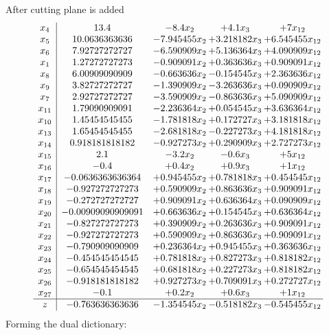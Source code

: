 \documentclass[11pt]{article}
\begin{document}
 After cutting plane is added 
\[\begin{array}{c| c c@{\hskip 2pt} c@{\hskip 2pt} c@{\hskip 2pt} }
 x_{4}   &  13.4 & -8.4 x_{2} & + 4.1 x_{3} & + 7 x_{12}\\
 x_{5}   &  10.0636363636 & -7.945455 x_{2} & + 3.218182 x_{3} & + 6.545455 x_{12}\\
 x_{6}   &  7.92727272727 & -6.590909 x_{2} & + 5.136364 x_{3} & + 4.090909 x_{12}\\
 x_{1}   &  1.27272727273 & -0.909091 x_{2} & + 0.363636 x_{3} & + 0.909091 x_{12}\\
 x_{8}   &  6.00909090909 & -0.663636 x_{2} & -0.154545 x_{3} & + 2.363636 x_{12}\\
 x_{9}   &  3.82727272727 & -1.390909 x_{2} & -3.263636 x_{3} & + 0.090909 x_{12}\\
 x_{7}   &  2.92727272727 & -3.590909 x_{2} & -0.863636 x_{3} & + 5.090909 x_{12}\\
 x_{11}   &  1.79090909091 & -2.236364 x_{2} & + 0.054545 x_{3} & + 3.636364 x_{12}\\
 x_{10}   &  1.45454545455 & -1.781818 x_{2} & + 0.172727 x_{3} & + 3.181818 x_{12}\\
 x_{13}   &  1.65454545455 & -2.681818 x_{2} & -0.227273 x_{3} & + 4.181818 x_{12}\\
 x_{14}   &  0.918181818182 & -0.927273 x_{2} & + 0.290909 x_{3} & + 2.727273 x_{12}\\
 x_{15}   &  2.1 & -3.2 x_{2} & -0.6 x_{3} & + 5 x_{12}\\
 x_{16}   &  -0.4 & + 0.4 x_{2} & + 0.9 x_{3} & + 1 x_{12}\\
 x_{17}   &  -0.0636363636364 & + 0.945455 x_{2} & + 0.781818 x_{3} & + 0.454545 x_{12}\\
 x_{18}   &  -0.927272727273 & + 0.590909 x_{2} & + 0.863636 x_{3} & + 0.909091 x_{12}\\
 x_{19}   &  -0.272727272727 & + 0.909091 x_{2} & + 0.636364 x_{3} & + 0.090909 x_{12}\\
 x_{20}   &  -0.00909090909091 & + 0.663636 x_{2} & + 0.154545 x_{3} & + 0.636364 x_{12}\\
 x_{21}   &  -0.827272727273 & + 0.390909 x_{2} & + 0.263636 x_{3} & + 0.909091 x_{12}\\
 x_{22}   &  -0.927272727273 & + 0.590909 x_{2} & + 0.863636 x_{3} & + 0.909091 x_{12}\\
 x_{23}   &  -0.790909090909 & + 0.236364 x_{2} & + 0.945455 x_{3} & + 0.363636 x_{12}\\
 x_{24}   &  -0.454545454545 & + 0.781818 x_{2} & + 0.827273 x_{3} & + 0.818182 x_{12}\\
 x_{25}   &  -0.654545454545 & + 0.681818 x_{2} & + 0.227273 x_{3} & + 0.818182 x_{12}\\
 x_{26}   &  -0.918181818182 & + 0.927273 x_{2} & + 0.709091 x_{3} & + 0.272727 x_{12}\\
 x_{27}   &  -0.1 & + 0.2 x_{2} & + 0.6 x_{3} & + 1 x_{12}\\
\hline
z    &  -0.763636363636 & -1.354545 x_{2} & -0.518182 x_{3} & -0.545455 x_{12}\\
\end{array}\]
Forming the dual dictionary:
\end{document}
